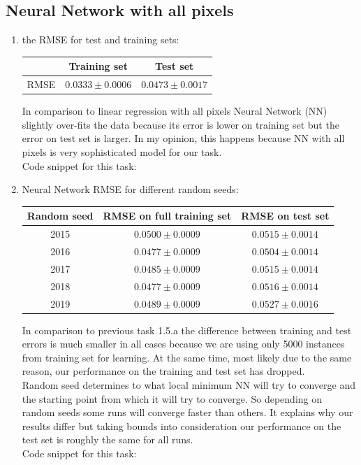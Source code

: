 \documentclass{article}
\begin{document}
		\subsection{Neural Network with all pixels}
			\begin{enumerate}[label=(\alph*)]
				\item
					the RMSE for test and training sets:
					\begin{center}
						\begin{tabular}{| c | c | c |}
							\hline
							\, & Training set & Test set \\ \hline
							RMSE  & $0.0333 \pm 0.0006$ & $0.0473 \pm 0.0017$ \\ 
							\hline
						\end{tabular}
					\end{center}
					In comparison to linear regression with all pixels Neural Network (NN) slightly over-fits the data because  its error is lower on training set but the error on test set is larger. In my opinion, this happens because NN with all pixels is very sophisticated model for our task.\\
					Code snippet for this task:
					
					
				\item
					Neural Network RMSE for different random seeds:
					\begin{center}
						\begin{tabular}{| c | c | c |}
							\hline
							Random seed & RMSE on full training set & RMSE on test set\\ \hline
							2015 & $0.0500 \pm 0.0009$ & $0.0515 \pm 0.0014$ \\ 
							2016 & $0.0477 \pm 0.0009$ & $0.0504 \pm 0.0014$ \\ 
							2017 & $0.0485 \pm 0.0009$ & $0.0515 \pm 0.0014$ \\ 
							2018 & $0.0477 \pm 0.0009$ & $0.0516 \pm 0.0014$ \\ 
							2019 & $0.0489 \pm 0.0009$ & $0.0527 \pm 0.0016$ \\
							\hline
						\end{tabular}
					\end{center}
					In comparison to previous task 1.5.a the difference between training and test errors is much smaller in all cases because we are using only 5000 instances from training set for learning. At the same time, most likely due to the same reason, our performance on the training and test set has dropped. \\
					Random seed determines to what local minimum NN will try to converge and the starting point from which it will try to converge. So depending on random seeds some runs will converge faster than others. It explains why our results differ but taking bounds into consideration our performance on the test set is roughly the same for all runs.\\
					Code snippet for this task:
					
			\end{enumerate}
\end{document}
